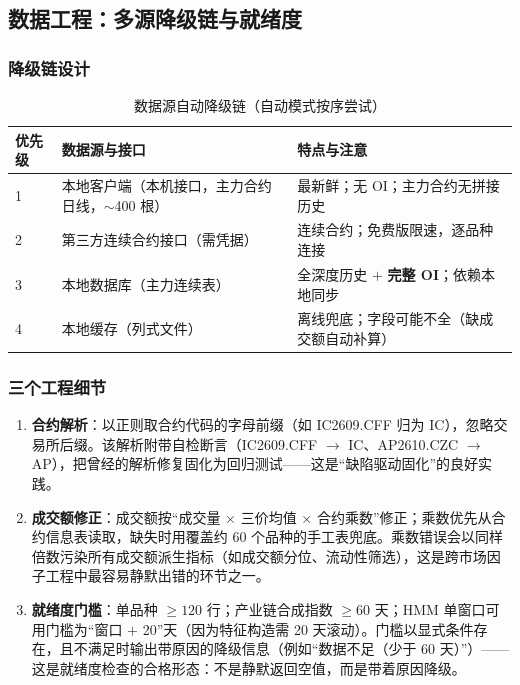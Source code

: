 \subsection{数据工程：多源降级链与就绪度}

\subsubsection{降级链设计}

\begin{table}[htbp]
\centering
\footnotesize
\begin{tabular}{p{2.4cm}p{4.7cm}p{4.3cm}}
\toprule
\textbf{优先级} & \textbf{数据源与接口} & \textbf{特点与注意} \\
\midrule
1 & 本地客户端（本机接口，主力合约日线，$\sim$400 根） & 最新鲜；无 OI；主力合约无拼接历史 \\
2 & 第三方连续合约接口（需凭据） & 连续合约；免费版限速，逐品种连接 \\
3 & 本地数据库（主力连续表） & 全深度历史 $+$ \textbf{完整 OI}；依赖本地同步 \\
4 & 本地缓存（列式文件） & 离线兜底；字段可能不全（缺成交额自动补算） \\
\bottomrule
\end{tabular}
\caption{数据源自动降级链（自动模式按序尝试）}
\label{tab:data-chain}
\end{table}

\subsubsection{三个工程细节}

\begin{enumerate}[itemsep=3pt]
\item \textbf{合约解析}：以正则取合约代码的字母前缀（如 IC2609.CFF 归为 IC），忽略交易所后缀。该解析附带自检断言（IC2609.CFF $\to$ IC、AP2610.CZC $\to$ AP），把曾经的解析修复固化为回归测试——这是“缺陷驱动固化”的良好实践。
\item \textbf{成交额修正}：成交额按“成交量 $\times$ 三价均值 $\times$ 合约乘数”修正；乘数优先从合约信息表读取，缺失时用覆盖约 60 个品种的手工表兜底。乘数错误会以同样倍数污染所有成交额派生指标（如成交额分位、流动性筛选），这是跨市场因子工程中最容易静默出错的环节之一。
\item \textbf{就绪度门槛}：单品种 $\ge 120$ 行；产业链合成指数 $\ge 60$ 天；HMM 单窗口可用门槛为“窗口 $+$ 20”天（因为特征构造需 20 天滚动）。门槛以显式条件存在，且不满足时输出带原因的降级信息（例如“数据不足（少于 60 天）”）——这是就绪度检查的合格形态：不是静默返回空值，而是带着原因降级。
\end{enumerate}

